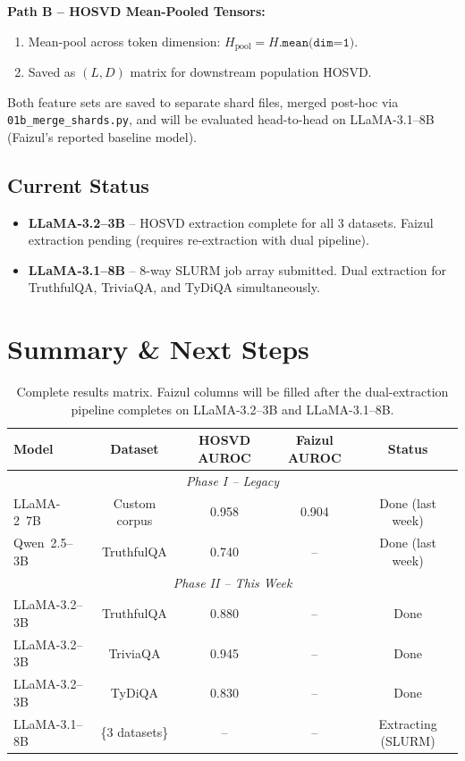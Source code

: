\documentclass[11pt,a4paper]{article}
\begin{document}
\noindent
\textbf{Path B -- HOSVD Mean-Pooled Tensors:}
\begin{enumerate}
  \item Mean-pool across token dimension: $H_{\text{pool}} = H.\texttt{mean(dim=1)}$.
  \item Saved as $(L, D)$ matrix for downstream population HOSVD.
\end{enumerate}

\medskip
\noindent
Both feature sets are saved to separate shard files, merged post-hoc via
\texttt{01b\_merge\_shards.py}, and will be evaluated head-to-head on
LLaMA-3.1--8B (Faizul's reported baseline model).

\subsection{Current Status}

\begin{itemize}
  \item \textbf{LLaMA-3.2--3B} -- HOSVD extraction complete for all 3 datasets.
        Faizul extraction pending (requires re-extraction with dual pipeline).
  \item \textbf{LLaMA-3.1--8B} -- 8-way SLURM job array submitted.
        Dual extraction for TruthfulQA, TriviaQA, and TyDiQA simultaneously.
\end{itemize}

\section{Summary \& Next Steps}

\begin{table}[h]
\centering
\begin{tabular}{lcccc}
\toprule
\textbf{Model} & \textbf{Dataset} & \textbf{HOSVD AUROC} & \textbf{Faizul AUROC} & \textbf{Status} \\
\midrule
\multicolumn{5}{c}{\textit{Phase I -- Legacy}} \\
LLaMA-2~7B  & Custom corpus      & 0.958 & 0.904 & Done (last week) \\
Qwen~2.5--3B & TruthfulQA        & 0.740 & --    & Done (last week) \\
\midrule
\multicolumn{5}{c}{\textit{Phase II -- This Week}} \\
LLaMA-3.2--3B & TruthfulQA       & 0.880 & --    & Done \\
LLaMA-3.2--3B & TriviaQA         & 0.945 & --    & Done \\
LLaMA-3.2--3B & TyDiQA           & 0.830 & --    & Done \\
LLaMA-3.1--8B & \{3 datasets\}   & --    & --    & Extracting (SLURM) \\
\bottomrule
\end{tabular}
\caption{Complete results matrix.  Faizul columns will be filled after the
         dual-extraction pipeline completes on LLaMA-3.2--3B and
         LLaMA-3.1--8B.}
\end{table}
\end{document}
